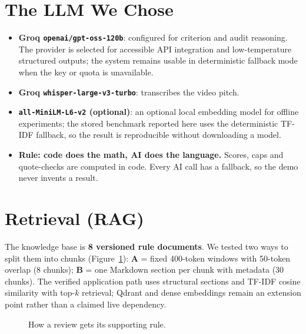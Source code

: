 \documentclass[11pt,a4paper]{article}
\begin{document}
\section{The LLM We Chose}
\begin{itemize}
  \item \textbf{Groq \texttt{openai/gpt-oss-120b}}: configured for criterion and audit reasoning. The provider is selected for accessible API integration and low-temperature structured outputs; the system remains usable in deterministic fallback mode when the key or quota is unavailable.
  \item \textbf{Groq \texttt{whisper-large-v3-turbo}}: transcribes the video pitch.
  \item \textbf{\texttt{all-MiniLM-L6-v2} (optional)}: an optional local embedding model for offline experiments; the stored benchmark reported here uses the deterministic TF-IDF fallback, so the result is reproducible without downloading a model.
  \item \textbf{Rule: code does the math, AI does the language.} Scores, caps and quote-checks are computed in code. Every AI call has a fallback, so the demo never invents a result.
\end{itemize}

\section{Retrieval (RAG)}
The knowledge base is \textbf{8 versioned rule documents}. We tested two ways to split them into chunks (Figure~\ref{fig:rag}): \textbf{A} = fixed 400-token windows with 50-token overlap (8 chunks); \textbf{B} = one Markdown section per chunk with metadata (30 chunks). The verified application path uses structural sections and TF-IDF cosine similarity with top-$k$ retrieval; Qdrant and dense embeddings remain an extension point rather than a claimed live dependency.

\begin{figure}[h]
\centering
{}
\caption{How a review gets its supporting rule.}
\label{fig:rag}
\end{figure}
\end{document}
